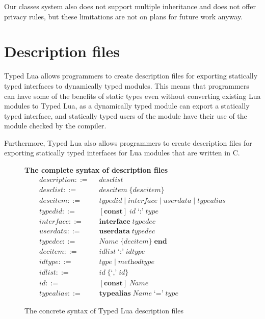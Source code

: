 Our classes system also does not support multiple inheritance
and does not offer privacy rules, but these limitations are not
on plans for future work anyway.

\section{Description files}
\label{sec:tld}

Typed Lua allows programmers to create description files
for exporting statically typed interfaces to dynamically typed modules.
This means that programmers can have some of the benefits of
static types even without converting existing Lua modules to Typed Lua,
as a dynamically typed module can export a statically typed interface,
and statically typed users of the module have their use of the module
checked by the compiler.

Furthermore, Typed Lua also allows programmers to create description
files for exporting statically typed interfaces for Lua modules
that are written in C.

\begin{figure}[!ht]
\textbf{The complete syntax of description files}\\
\dstart
\begin{align*}
\textit{description} ::= & \;\; \textit{desclist}\\
\textit{desclist} ::= & \;\; \textit{descitem} \; \{ \textit{descitem} \}\\
\textit{descitem} ::= & \;\; \textit{typedid} \; | \;
  \textit{interface} \; | \;
  \textit{userdata} \; | \;
  \textit{typealias}\\
\textit{typedid} ::= & \;\; [\textbf{const}] \; \textit{id} \; \texttt{`:'} \; \textit{type}\\ 
\textit{interface} ::= & \;\; \textbf{interface} \; \textit{typedec}\\
\textit{userdata} ::= & \;\; \textbf{userdata} \; \textit{typedec}\\
\textit{typedec} ::= & \;\; \textit{Name} \; \{\textit{decitem}\} \; \textbf{end}\\
\textit{decitem} ::= & \;\; \textit{idlist} \; \texttt{`:'} \; \textit{idtype}\\
\textit{idtype} ::= & \;\; \textit{type} \; | \; \textit{methodtype}\\
\textit{idlist} ::= & \;\; \textit{id} \; \{\texttt{`,'} \; \textit{id}\}\\
\textit{id} ::= & \;\; [\textbf{const}] \; \textit{Name}\\
\textit{typealias} ::= & \;\; \textbf{typealias} \; \textit{Name} \; \texttt{`='} \; \textit{type}
\end{align*}
\dend
\caption{The concrete syntax of Typed Lua description files}
\label{fig:tldsyntax}
\end{figure}

